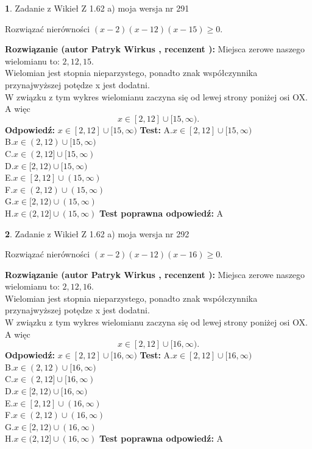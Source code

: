 \documentclass[12pt, a4paper]{article}
\theoremstyle{definition} %
\newtheorem{zad}{}
\newcommand{\zadStart}[1]{\begin{zad}#1\newline}
\newcommand{\zadStop}{\end{zad}}
\newcommand{\rozwStart}[2]{\noindent \textbf{Rozwiązanie (autor #1 , recenzent #2): }\newline}
\newcommand{\rozwStop}{\newline}
\newcommand{\odpStart}{\noindent \textbf{Odpowiedź:}\newline}
\newcommand{\odpStop}{\newline}
\newcommand{\testStart}{\noindent \textbf{Test:}\newline}
\newcommand{\testStop}{\newline}
\newcommand{\kluczStart}{\noindent \textbf{Test poprawna odpowiedź:}\newline}
\newcommand{\kluczStop}{\newline}
\begin{document}
\zadStart{Zadanie z Wikieł Z 1.62 a) moja wersja nr 291}

Rozwiązać nierówności $(x-2)(x-12)(x-15)\ge0$.
\zadStop
\rozwStart{Patryk Wirkus}{}
Miejsca zerowe naszego wielomianu to: $2, 12, 15$.\\
Wielomian jest stopnia nieparzystego, ponadto znak współczynnika przy\linebreak najwyższej potędze x jest dodatni.\\ W związku z tym wykres wielomianu zaczyna się od lewej strony poniżej osi OX. A więc $$x \in [2,12] \cup [15,\infty).$$
\rozwStop
\odpStart
$x \in [2,12] \cup [15,\infty)$
\odpStop
\testStart
A.$x \in [2,12] \cup [15,\infty)$\\
B.$x \in (2,12) \cup [15,\infty)$\\
C.$x \in (2,12] \cup [15,\infty)$\\
D.$x \in [2,12) \cup [15,\infty)$\\
E.$x \in [2,12] \cup (15,\infty)$\\
F.$x \in (2,12) \cup (15,\infty)$\\
G.$x \in [2,12) \cup (15,\infty)$\\
H.$x \in (2,12] \cup (15,\infty)$
\testStop
\kluczStart
A
\kluczStop



\zadStart{Zadanie z Wikieł Z 1.62 a) moja wersja nr 292}

Rozwiązać nierówności $(x-2)(x-12)(x-16)\ge0$.
\zadStop
\rozwStart{Patryk Wirkus}{}
Miejsca zerowe naszego wielomianu to: $2, 12, 16$.\\
Wielomian jest stopnia nieparzystego, ponadto znak współczynnika przy\linebreak najwyższej potędze x jest dodatni.\\ W związku z tym wykres wielomianu zaczyna się od lewej strony poniżej osi OX. A więc $$x \in [2,12] \cup [16,\infty).$$
\rozwStop
\odpStart
$x \in [2,12] \cup [16,\infty)$
\odpStop
\testStart
A.$x \in [2,12] \cup [16,\infty)$\\
B.$x \in (2,12) \cup [16,\infty)$\\
C.$x \in (2,12] \cup [16,\infty)$\\
D.$x \in [2,12) \cup [16,\infty)$\\
E.$x \in [2,12] \cup (16,\infty)$\\
F.$x \in (2,12) \cup (16,\infty)$\\
G.$x \in [2,12) \cup (16,\infty)$\\
H.$x \in (2,12] \cup (16,\infty)$
\testStop
\kluczStart
A
\kluczStop
\end{document}
